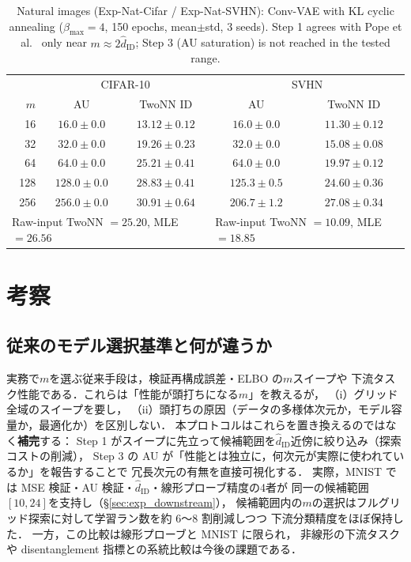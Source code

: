 \documentclass[11pt,a4paper]{jsarticle}
\newcommand{\hatdID}{\hat{d}_{\mathrm{ID}}}
\begin{document}
\begin{table}[H]
\centering
\caption{Natural images (Exp-Nat-Cifar / Exp-Nat-SVHN): Conv-VAE with KL
cyclic annealing ($\beta_{\max} = 4$, 150 epochs, mean$\pm$std, 3 seeds).
Step 1 agrees with Pope et al.~\cite{pope2021intrinsic} only near
$m \approx 2\hatdID$; Step 3 (AU saturation) is not reached in the tested
range.}
\label{tab:natural}
\small
\begin{tabular}{r cc | cc}
\toprule
 & \multicolumn{2}{c|}{CIFAR-10} & \multicolumn{2}{c}{SVHN} \\
$m$ & AU & TwoNN ID & AU & TwoNN ID \\
\midrule
 16 & $16.0 \pm 0.0$ & $13.12 \pm 0.12$ & $16.0 \pm 0.0$ & $11.30 \pm 0.12$ \\
 32 & $32.0 \pm 0.0$ & $19.26 \pm 0.23$ & $32.0 \pm 0.0$ & $15.08 \pm 0.08$ \\
 64 & $64.0 \pm 0.0$ & $\mathbf{25.21 \pm 0.41}$ & $64.0 \pm 0.0$ & $19.97 \pm 0.12$ \\
128 & $128.0 \pm 0.0$ & $28.83 \pm 0.41$ & $125.3 \pm 0.5$ & $24.60 \pm 0.36$ \\
256 & $256.0 \pm 0.0$ & $30.91 \pm 0.64$ & $206.7 \pm 1.2$ & $27.08 \pm 0.34$ \\
\midrule
\multicolumn{3}{l|}{Raw-input TwoNN $= 25.20$, MLE $= 26.56$} &
\multicolumn{2}{l}{Raw-input TwoNN $= 10.09$, MLE $= 18.85$} \\
\bottomrule
\end{tabular}
\end{table}

\section{考察}\label{sec:discussion}

\subsection{従来のモデル選択基準と何が違うか}\label{sec:disc_model_selection}

実務で$m$を選ぶ従来手段は，検証再構成誤差・ELBO の$m$スイープや
下流タスク性能である．これらは「性能が頭打ちになる$m$」を教えるが，
（i）グリッド全域のスイープを要し，
（ii）頭打ちの原因（データの多様体次元か，モデル容量か，最適化か）を区別しない．
本プロトコルはこれらを置き換えるのではなく\textbf{補完}する：
Step 1 がスイープに先立って候補範囲を$\hatdID$近傍に絞り込み（探索コストの削減），
Step 3 の AU が「性能とは独立に，何次元が実際に使われているか」を報告することで
冗長次元の有無を直接可視化する．
実際，MNIST では MSE 検証・AU 検証・$\hatdID$・線形プローブ精度の4者が
同一の候補範囲$[10, 24]$を支持し（§\ref{sec:exp_downstream}），
候補範囲内の$m$の選択はフルグリッド探索に対して学習ラン数を約 6〜8 割削減しつつ
下流分類精度をほぼ保持した．
一方，この比較は線形プローブと MNIST に限られ，
非線形の下流タスクや disentanglement 指標との系統比較は今後の課題である．
\end{document}
